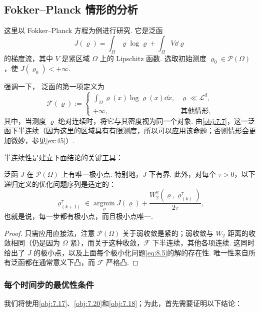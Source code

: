 \subsection{Fokker--Planck 情形的分析}\label{sec:8.3}
\label{idx:i116-p293}
这里以 Fokker--Planck 方程为例进行研究. 它是泛函
\[
J(\varrho)=\int_\Omega\varrho\log\varrho+\int_\Omega V\dd\varrho
\]
的梯度流，其中 $V$ 是紧区域 $\Omega$ 上的 Lipschitz 函数. 选取初始测度 $\varrho_0\in\mathscr P(\Omega)$，使 $J(\varrho_0)<+\infty$.

强调一下，\label{idx:i51-p293}
泛函的第一项定义为
\[
\mathscr F(\varrho):=\begin{cases}
\displaystyle\int_\Omega\varrho(x)\log\varrho(x)\dd x,&\varrho\ll\mathscr L^d,\\
+\infty,&\text{其他情形},
\end{cases}
\]
其中，当测度 $\varrho$ 绝对连续时，将它与其密度视为同一个对象. 由\autoref{obj:7.7}，这一泛函下半连续（因为这里的区域具有有限测度，所以可以应用该命题；否则情形会更加微妙，参见\autoref{ex:45}）.

半连续性是建立下面结论的关键工具：
\begin{proposition}\label{obj:8.5}
泛函 $J$ 在 $\mathscr P(\Omega)$ 上有唯一极小点. 特别地，$J$ 下有界. 此外，对每个 $\tau>0$，以下递归定义的优化问题序列是适定的：
\begin{equation}\label{eq:8.5}
\varrho_{(k+1)}^\tau\in\operatorname*{argmin}_\varrho
J(\varrho)+\frac{W_2^2(\varrho,\varrho_{(k)}^\tau)}{2\tau},
\end{equation}
也就是说，每一步都有极小点，而且极小点唯一.
\end{proposition}
\begin{proof}
只需应用直接法，注意 $\mathscr P(\Omega)$ 关于弱收敛是紧的；弱收敛与 $W_2$ 距离的收敛相同（仍是因为 $\Omega$ 紧），而关于这种收敛，$\mathscr F$ 下半连续，其他各项连续. 这同时给出了 $J$ 的极小点，以及上面每个极小化问题\eqref{eq:8.5}的解的存在性. 唯一性来自所有泛函都在通常意义下凸，而 $\mathscr F$ 严格凸.
\end{proof}

\subsubsection*{每个时间步的最优性条件}
我们将使用\autoref{obj:7.17}、\autoref{obj:7.20}和\autoref{obj:7.18}；为此，首先需要证明以下结论：

